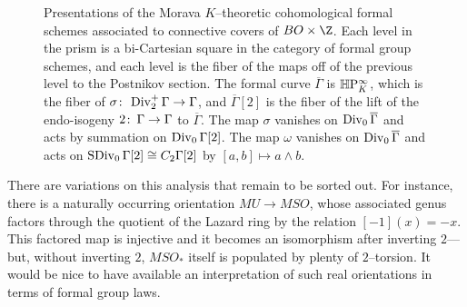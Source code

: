 \begin{figure}
\begin{center}
\end{center}
\caption{Presentations of the Morava $K$--theoretic cohomological formal schemes associated to connective covers of $BO \times \Z$.  Each level in the prism is a bi-Cartesian square in the category of formal group schemes, and each level is the fiber of the maps off of the previous level to the Postnikov section.  The formal curve $\overline \Gamma$ is $\mathbb H\mathrm P^\infty_K$, which is the fiber of $\sigma\colon\thinspace \operatorname{Div}_2^+ \Gamma \to \Gamma$, and $\overline \Gamma[2]$ is the fiber of the lift of the endo-isogeny $2\colon\thinspace \Gamma \to \Gamma$ to $\overline \Gamma$.  The map $\sigma$ vanishes on $\operatorname{Div}_0 \overline \Gamma$ and acts by summation on $\operatorname{Div}_0 \Gamma[2]$.  The map $\omega$ vanishes on $\operatorname{Div}_0 \overline \Gamma$ and acts on $\operatorname{SDiv}_0 \Gamma[2] \cong C_2 \Gamma[2]$ by $[a, b] \mapsto a \wedge b$.}\label{MoravaKthyOfBO}
\end{figure}

\begin{remark}
There are variations on this analysis that remain to be sorted out.  For instance, there is a naturally occurring orientation $MU \to MSO$, whose associated genus factors through the quotient of the Lazard ring by the relation $[-1](x) = -x$.  This factored map is injective and it becomes an isomorphism after inverting $2$---but, without inverting $2$, $MSO_*$ itself is populated by plenty of $2$--torsion.  It would be nice to have available an interpretation of such real orientations in terms of formal group laws.
\end{remark}




















